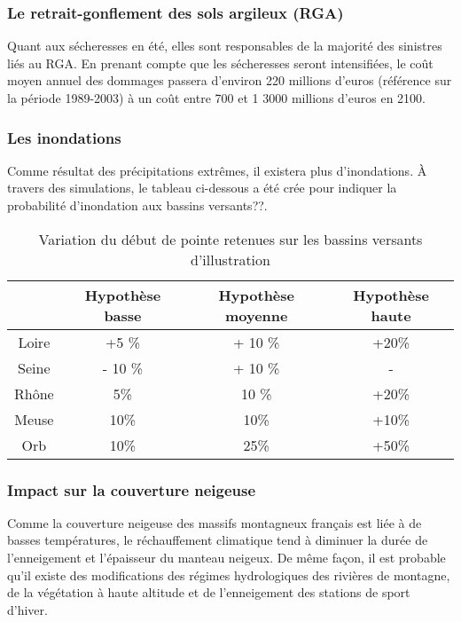 \documentclass[a4paper,10pt]{article}
\begin{document}
\subsubsection*{Le retrait-gonflement des sols argileux (RGA)}

Quant {\color{red}aux} sécheresses {\color{red}en} été,  elles sont responsables de la majorité des sinistres liés au RGA. En prenant compte que les sécheresses seront intensifiées, le coût moyen annuel
des dommages  passera d’environ 220  millions d’euros (référence sur  la période
1989-2003) à un coût entre 700 et 1 3000 millions d’euros en 2100.

\subsubsection*{Les inondations}
Comme résultat des précipitations extrêmes, il existera plus {\color{red}d'inondations}. À travers des simulations, le tableau ci-dessous a été crée pour indiquer la probabilité  d'inondation {\color{red} aux bassins versants??}. 

\begin{table}[H]
  \begin{center}
    \caption{Variation du début de pointe retenues sur les bassins versants d’illustration}
    \begin{tabular}{|c|c|c|c|}
      \hline
      & Hypothèse basse &Hypothèse moyenne &Hypothèse haute\\
      \hline
      Loire & +5 \% & + 10 \% & +20\%\\
      Seine & - 10 \% &+ 10 \% & - \\ 
      Rhône & 5\% & 10 \% & +20\%\\
      Meuse & 10\%& 10\%& +10\%\\
      Orb &10\% & 25\% & +50\% \\
      \hline
    \end{tabular}
  \end{center}
\end{table}

\subsubsection*{Impact sur la couverture neigeuse}
Comme la  couverture neigeuse  des massifs montagneux  français {\color{red}est}
liée à {\color{red}de basses}
températures,  le   réchauffement  climatique  tend  à  diminuer   la  durée  de
l’enneigement et l’épaisseur du  manteau neigeux. De même façon{\color{red},} il
est probable {\color{red}qu’il} existe des
modifications  des  régimes  hydrologiques  des  rivières  de  montagne,  de  la végétation à haute altitude et de l’enneigement des stations de sport d’hiver. 
\end{document}
